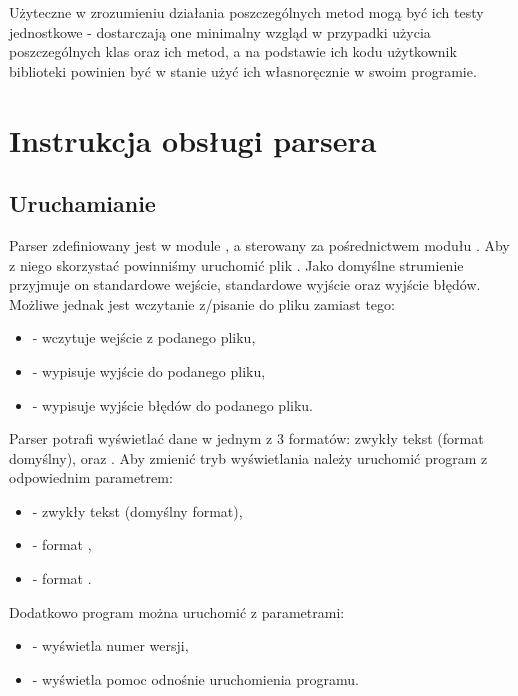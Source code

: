 \documentclass{standalone}
\begin{document}
Użyteczne w zrozumieniu działania poszczególnych metod mogą być ich testy jednostkowe - dostarczają one minimalny wzgląd
w przypadki użycia poszczególnych klas oraz ich metod, a na podstawie ich kodu użytkownik biblioteki powinien być w stanie
użyć ich własnoręcznie w swoim programie.

\chapter{Instrukcja obsługi parsera}

\section{Uruchamianie}

Parser zdefiniowany jest w module , a sterowany za pośrednictwem modułu . Aby z niego skorzystać
powinniśmy uruchomić plik . Jako domyślne strumienie przyjmuje on standardowe wejście, standardowe wyjście
oraz wyjście błędów. Możliwe jednak jest wczytanie z/pisanie do pliku zamiast tego:
\begin{itemize}
\item {} - wczytuje wejście z podanego pliku,
\item {} - wypisuje wyjście do podanego pliku,
\item {} - wypisuje wyjście błędów do podanego pliku.
\end{itemize}

Parser potrafi wyświetlać dane w jednym z 3 formatów: zwykły tekst (format domyślny),  oraz .
Aby zmienić tryb wyświetlania należy uruchomić program z odpowiednim parametrem:
\begin{itemize}
\item {} - zwykły tekst (domyślny format),
\item {} - format ,
\item {} - format .
\end{itemize}

Dodatkowo program można uruchomić z parametrami:
\begin{itemize}
\item {} - wyświetla numer wersji,
\item {} - wyświetla pomoc odnośnie uruchomienia programu.
\end{itemize}
\end{document}
